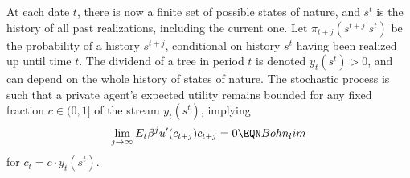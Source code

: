 At each date $t$, there is now a finite set of possible states of nature,
 and $s^t$ is the history of all past realizations, including the current one.
Let $\pi_{t+j}(s^{t+j}|s^t)$ be the probability of a history $s^{t+j}$,
conditional on history $s^t$ having been realized up until time $t$.
The dividend of a tree in period $t$ is denoted $y_t(s^t)>0$,   and
can depend on the
whole history of states of nature. The stochastic process is such
that a private agent's expected utility remains bounded for any fixed fraction
$c\in(0,1]$ of the stream $y_t(s^t)$, implying
$$
\lim_{j\to\infty} E_t \beta^j u'(c_{t+j}) c_{t+j} = 0          \EQN Bohn_lim
$$
for $c_t=c\cdot y_t(s^t)$.


